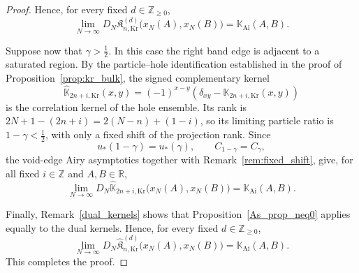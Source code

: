 \documentclass[reqno,11pt]{amsart}
\newcommand{\Khat}{\widehat{\mathfrak{K}}}
\newcommand{\ZZ}{\mathbb{Z}}
\newcommand{\RR}{\mathbb{R}}
\theoremstyle{plain}
\theoremstyle{definition}
\numberwithin{equation}{section}
\begin{document}
\begin{proof}
Hence, for every fixed \(d\in\ZZ_{\geq0}\),
\[
\lim_{N\to\infty}
D_N
\mathfrak K^{(d)}_{n,\mathrm{Kr}}
\bigl(x_N(A),x_N(B)\bigr)
=
\mathbb K_{\mathrm{Ai}}(A,B).
\]

Suppose now that \(\gamma>\frac12\). In this case the right band edge is adjacent to a saturated region. By the particle--hole identification established in the proof of Proposition~\ref{prop:kr_bulk}, the signed complementary kernel
\[
\widehat{\mathbb K}_{2n+i,\mathrm{Kr}}(x,y)
=
(-1)^{x-y}
\left(
\delta_{xy}
-
\mathbb K_{2n+i,\mathrm{Kr}}(x,y)
\right)
\]
is the correlation kernel of the hole ensemble. Its rank is $2N+1-(2n+i)=2(N-n)+(1-i)$, so its limiting particle ratio is $1-\gamma<\frac12$, with only a fixed shift of the projection rank. Since
\[
u_\ast(1-\gamma)=u_\ast(\gamma),
\qquad
C_{1-\gamma}=C_\gamma,
\]
the void-edge Airy asymptotics
\cite[Lemma~7.16]{baik2007discrete} 
together with Remark~\ref{rem:fixed_shift}, give, for all fixed
$i\in\ZZ$ and $A,B\in\RR$,
\[
\lim_{N\to\infty}
D_N
\widehat{\mathbb K}_{2n+i,\mathrm{Kr}}
\bigl(x_N(A),x_N(B)\bigr)
=
\mathbb K_{\mathrm{Ai}}(A,B).
\]

Finally, Remark~\ref{dual_kernels} shows that
Proposition~\ref{As_prop_neq0} applies equally to the dual kernels. Hence, for every fixed \(d\in\ZZ_{\geq0}\),
\[
\lim_{N\to\infty}
D_N
\Khat^{(d)}_{n,\mathrm{Kr}}
\bigl(x_N(A),x_N(B)\bigr)
=
\mathbb K_{\mathrm{Ai}}(A,B).
\]
This completes the proof.
\end{proof}
\end{document}
